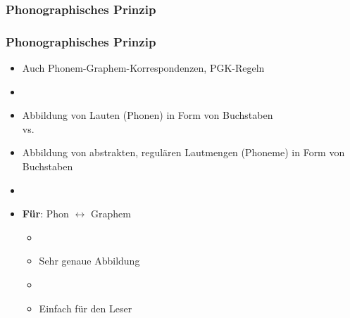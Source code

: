 \subsubsection{Phonographisches Prinzip}


\begin{frame}
\frametitle{Phonographisches Prinzip}

\begin{itemize}
	\item Auch Phonem-Graphem-Korrespondenzen, PGK-Regeln
	\item[]
\pause	
	\item Abbildung von Lauten (Phonen) in Form von Buchstaben \\ vs.
	\item Abbildung von abstrakten, regulären Lautmengen (Phoneme) in
Form von Buchstaben
	\item[]
	\item \textbf{Für}: Phon $\leftrightarrow$ Graphem
	
	\begin{itemize}
		\item[]
		\item Sehr genaue Abbildung
		\item[]
		\item Einfach für den Leser
	\end{itemize}
\end{itemize}


\end{frame}



